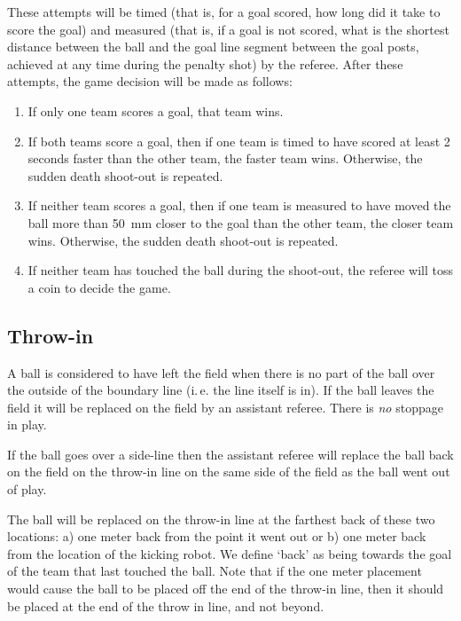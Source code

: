 \documentclass[12pt]{article}
\newcommand{\ie}{\mbox{i.\,e.}\xspace}
\begin{document}
These attempts will be timed (that is, for a goal scored, how long did it take to score the goal) and measured (that is, if a goal is not scored, what is the shortest distance between the ball and the goal line segment between the goal posts, achieved at any time during the penalty shot) by the referee. After these attempts, the game decision will be made as follows:

\begin{enumerate}

\item If only one team scores a goal, that team wins.

\item If both teams score a goal, then if one team is timed to have scored at least 2 seconds faster than the other team, the faster team wins. Otherwise, the sudden death shoot-out is repeated.

\item If neither team scores a goal, then if one team is measured to have moved the ball more than 50~mm closer to the goal than the other team, the closer team wins. Otherwise, the sudden death shoot-out is repeated.

\item If neither team has touched the ball during the shoot-out, the referee will toss a coin to decide the game.

\end{enumerate}

\subsection{Throw-in}
\label{sec:throw_in}

A ball is considered to have left the field when there is no part of the ball over the outside of the boundary line (\ie the line itself is in). If the ball leaves the field it will be replaced on the field by an assistant referee. There is \emph{no} stoppage in play.

If the ball goes over a side-line then the assistant referee will replace the ball back on the field on the throw-in line on the same side of the field as the ball went out of play.

The ball will be replaced on the throw-in line at the farthest back of these two locations: a) one meter back from the point it went out or b) one meter back from the location of the kicking robot. We define `back' as being towards the goal of the team that last touched the ball. Note that if the one meter placement would cause the ball to be placed off the end of the throw-in line, then it should be placed at the end of the throw in line, and not beyond.
\end{document}
